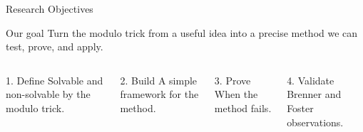 ﻿\documentclass[10pt,aspectratio=169]{beamer}
\begin{document}
\begin{frame}{Research Objectives}
    \begin{block}{Our goal}
        Turn the modulo trick from a useful idea into a precise method we can test, prove, and apply.
    \end{block}

    \vspace{0.15cm}
    \begin{columns}[T,onlytextwidth]
        \begin{exampleblock}{1. Define}
            \small Solvable and non-solvable by the modulo trick.
        \end{exampleblock}

        \begin{exampleblock}{2. Build}
            \small A simple framework for the method.
        \end{exampleblock}

        \begin{exampleblock}{3. Prove}
            \small When the method fails.
        \end{exampleblock}

        \begin{exampleblock}{4. Validate}
            \small Brenner and Foster observations.
        \end{exampleblock}
    \end{columns}
\end{frame}
\end{document}
